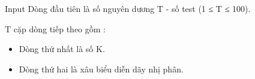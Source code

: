 Input
Dòng đầu tiên là số nguyên dương T - số test (1 ≤ T ≤ 100).

T cặp dòng tiếp theo gồm :
\begin{itemize}
	\item Dòng thứ nhất là số K.
	\item Dòng thứ hai là xâu biểu diễn dãy nhị phân.
\end{itemize}